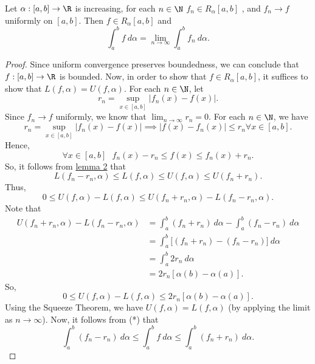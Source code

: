 \begin{theorem}[Rudin 7.16]\label{Uniform Convergence and integrability}
    Let \( \alpha: [a,b] \to \R  \) is increasing, for each \( n \in \N  \) \( {f}_{n} \in {R}_{\alpha} [a,b] \) , and \( {f}_{n} \to f  \) uniformly on \( [a,b] \). Then \( f \in {R}_{\alpha}[a,b] \) and 
    \[  \int_{ a }^{ b } f  \ d \alpha = \lim_{ n \to \infty  }  \int_{ a }^{ b } {f}_{n}  \ d \alpha. \]
\end{theorem}
\begin{proof}
    Since uniform convergence preserves boundedness, we can conclude that \( f: [a,b] \to \R  \) is bounded. Now, in order to show that \( f \in {R}_{\alpha}[a,b] \), it suffices to show that \( L(f,\alpha) = U(f,\alpha) \). For each \( n \in \N \), let 
    \[  {r}_{n} = \sup_{x \in [a,b]} | {f}_{n}(x) - f(x) |.  \]
    Since \( {f}_{n} \to f  \) uniformly, we know that \( \lim_{ n \to \infty  } {r}_{n} = 0  \). For each \( n \in \N  \), we have 
    \[  {r}_{n} = \sup_{x \in [a,b]} | {f}_{n}(x) - f(x) | \implies | f(x) - {f}_{n}(x) |  \leq {r}_{n} \forall x \in [a,b]. \]
    Hence, 
    \[  \forall x \in [a,b] \ \ \ {f}_{n}(x) - {r}_{n} \leq f(x) \leq {f}_{n}(x) + {r}_{n}. \tag{*}  \]
    So, it follows from {\hyperref[lemma 2]{lemma 2}} that 
    \[  L({f}_{n}- {r}_{n}, \alpha) \leq L(f,\alpha) \leq U(f,\alpha) \leq U({f}_{n} + {r}_{n}). \]
    Thus, 
    \[  0 \leq U(f,\alpha) - L(f,\alpha) \leq U({f}_{n} + {r}_{n}, \alpha) - L({f}_{n}-{r}_{n}, \alpha ). \]
    Note that 
    \begin{align*}
        U({f}_{n} + {r}_{n}, \alpha) - L({f}_{n}- {r}_{n}, \alpha) &= \int_{ a }^{ b } ({f}_{n} + {r}_{n})   \ d \alpha - \int_{ a }^{ b }  ({f}_{n} - {r}_{n}) \ d \alpha  \\
                                                                   &= \int_{ a }^{ b }  \Big[ ({f}_{n} + {r}_{n}) - ({f}_{n} - {r}_{n}) \Big]  \ d \alpha \\
                                                                   &= \int_{ a }^{ b } 2 {r}_{n}  \ d \alpha \\
                                                                   &= 2 {r}_{n} [\alpha(b) - \alpha(a)].
    \end{align*}
    So, 
    \[  0 \leq U(f,\alpha) - L(f,\alpha) \leq 2 {r}_{n} [\alpha(b) - \alpha(a)]. \]
    Using the Squeeze Theorem, we have \( U(f,\alpha) = L(f,\alpha) \) (by applying the limit as \( n \to \infty  \)). Now, it follows from (*) that 
    \[  \int_{ a }^{ b }  ({f}_{n}- {r}_{n})  \ d \alpha \leq \int_{ a }^{ b }  f  \ d \alpha \leq \int_{ a }^{ b }  ({f}_{n} + {r}_{n})   \ d \alpha. \]

\end{proof}
